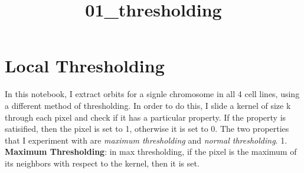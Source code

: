 \documentclass[11pt]{article}
\title{01\_thresholding}
\begin{document}
    
    
    \maketitle
    
    

    
    \section{Local Thresholding}\label{local-thresholding}

In this notebook, I extract orbits for a signle chromosome in all 4 cell
lines, using a different method of thresholding. In order to do this, I
slide a kernel of size k through each pixel and check if it has a
particular property. If the property is satisified, then the pixel is
set to 1, otherwise it is set to 0. The two properties that I experiment
with are \emph{maximum thresholding} and \emph{normal thresholding}. 1.
\textbf{Maximum Thresholding}: in max thresholding, if the pixel is the
maximum of its neighbors with respect to the kernel, then it is set.
\end{document}
